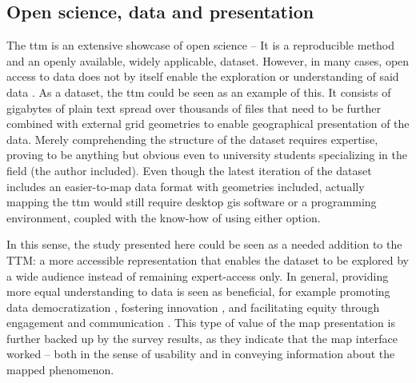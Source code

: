 \subsection{Open science, data and presentation}
The \acrshort{ttm} is an extensive showcase of open science --
It is a reproducible method and an openly available, widely applicable, dataset.
However, in many cases, open access to data does not by itself enable
the exploration or understanding of said data \parencite{obr2016}.
As a dataset, the \acrshort{ttm} could be seen as an example of this.
It consists of gigabytes of plain text spread over thousands of files
that need to be further combined with external grid geometries to enable
geographical presentation of the data.
Merely comprehending the structure of the dataset requires expertise,
proving to be anything but obvious even to university students specializing in the field
(the author included).
Even though the latest iteration of the dataset \parencite{fin2023}
includes an easier-to-map data format with geometries included,
actually mapping the \acrshort{ttm} would still require
desktop \acrshort{gis} software or a programming environment,
coupled with the know-how of using either option.

In this sense, the study presented here could be seen as a needed addition to the TTM:
a more accessible representation that enables the dataset to be explored by a wide audience
instead of remaining expert-access only.
In general, providing more equal understanding to data is seen as beneficial,
for example promoting data democratization \parencite{awa2020},
fostering innovation \parencite{man2011},
and facilitating equity through engagement and communication \parencite{kra2021}.
This type of value of the map presentation is further backed up by the survey results,
as they indicate that the map interface worked --
both in the sense of usability and in conveying information about the mapped phenomenon.

